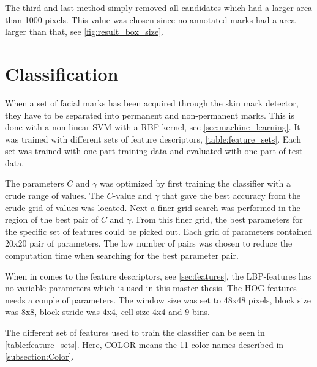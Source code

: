 The third and last method simply removed all candidates which had a larger area than 1000 pixels. This value was chosen since no annotated marks had a area larger than that, see \cref{fig:result_box_size}. 

\section{Classification}

When a set of facial marks has been acquired through the skin mark detector, they have to be separated into permanent and non-permanent marks. This is done with a non-linear SVM with a RBF-kernel, see \cref{sec:machine_learning}. It was trained with different sets of feature descriptors, \cref{table:feature_sets}. Each set was trained with one part training data and evaluated with one part of test data.

The parameters $C$ and $\gamma$ was optimized by first training the classifier with a crude range of values. The $C$-value and $\gamma$ that gave the best accuracy from the crude grid of values was located. Next a finer grid search was performed in the region of the best pair of $C$ and $\gamma$. From this finer grid, the best parameters for the specific set of features could be picked out. Each grid of parameters contained 20x20 pair of parameters. The low number of pairs was chosen to reduce the computation time when searching for the best parameter pair.  

When in comes to the feature descriptors, see \cref{sec:features}, the LBP-features has no variable parameters which is used in this master thesis. The HOG-features needs a couple of parameters. The window size was set to 48x48 pixels, block size was 8x8, block stride was 4x4, cell size 4x4 and 9 bins. 

The different set of features used to train the classifier can be seen in \cref{table:feature_sets}. Here, COLOR means the 11 color names described in \cref{subsection:Color}. 

